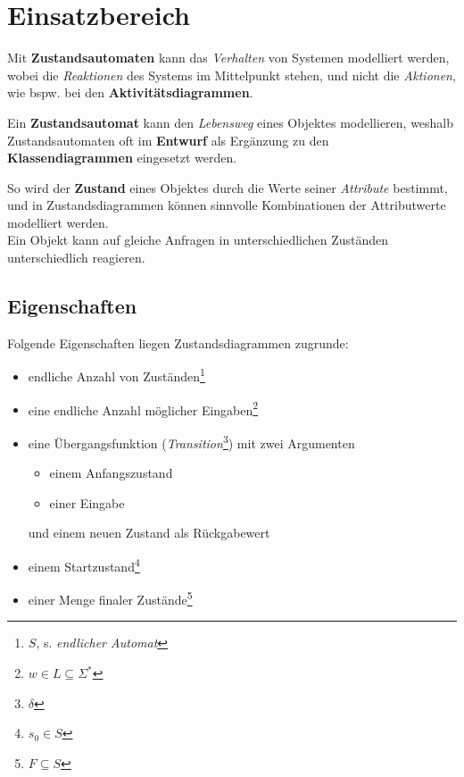 \section{Einsatzbereich}

Mit \textbf{Zustandsautomaten} kann das \textit{Verhalten} von Systemen modelliert werden, wobei die \textit{Reaktionen} des Systems im Mittelpunkt stehen, und nicht die \textit{Aktionen}, wie bspw. bei den \textbf{Aktivitätsdiagrammen}.

\begin{tcolorbox}[title=Zustandsautomat]
    Ein \textbf{Zustandsautomat} kann den \textit{Lebensweg} eines Objektes modellieren, weshalb Zustandsautomaten oft im \textbf{Entwurf} als Ergänzung zu den \textbf{Klassendiagrammen} eingesetzt werden.
\end{tcolorbox}

\noindent
So wird der \textbf{Zustand} eines Objektes durch die Werte seiner \textit{Attribute} bestimmt, und in Zustandsdiagrammen können sinnvolle Kombinationen der Attributwerte modelliert werden.\\
Ein Objekt kann auf gleiche Anfragen in unterschiedlichen Zuständen unterschiedlich reagieren.\\

\subsection*{Eigenschaften}

Folgende Eigenschaften liegen Zustandsdiagrammen zugrunde:

\begin{itemize}
    \item endliche Anzahl von Zuständen\footnote{$S$, s. \textit{endlicher Automat}}
    \item eine endliche Anzahl möglicher Eingaben\footnote{$w \in L \subseteq \Sigma^*$}
    \item eine Übergangsfunktion (\textit{Transition}\footnote{$\delta$}) mit zwei Argumenten
    \begin{itemize}
        \item einem Anfangszustand
        \item einer Eingabe
    \end{itemize}
    \noindent
    und einem neuen Zustand als Rückgabewert
    \item einem Startzustand\footnote{$s_0 \in S$}
    \item einer Menge finaler Zustände\footnote{$F \subseteq S$}
\end{itemize}